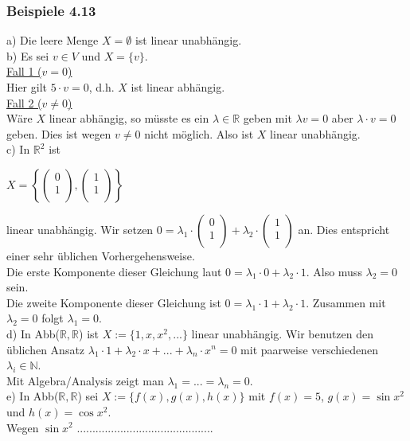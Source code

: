 \documentclass{article}
\begin{document}
\subsubsection*{Beispiele 4.13}
a) Die leere Menge $X = \emptyset$ ist linear unabhängig. \\
b) Es sei $v \in V$ und $X = \{v\}$. \\
\underline{Fall 1 ($v = 0$)} \\
Hier gilt $5 \cdot v = 0$, d.h. $X$ ist linear abhängig. \\
\underline{Fall 2 ($v \neq 0$)} \\
Wäre $X$ linear abhängig, so müsste es ein $\lambda \in \mathbb{R}$ geben mit $\lambda v = 0$ aber $\lambda \cdot v = 0$ geben. Dies ist wegen $v \neq 0$ nicht möglich. Also ist $X$ linear unabhängig. \\
c) In $\mathbb{R}^2$  ist \\
\begin{center}
    $X = \left\{ \begin{pmatrix}
        0 \\
        1 \\
    \end{pmatrix}, \begin{pmatrix}
        1 \\
        1 \\
    \end{pmatrix} \right\}$ \\
\end{center}
linear unabhängig. Wir setzen $0 = \lambda_1 \cdot \begin{pmatrix}
    0 \\
    1 \\
\end{pmatrix} + \lambda_2 \cdot \begin{pmatrix}
    1 \\
    1 \\
    \end{pmatrix}$
an. Dies entspricht einer sehr üblichen Vorhergehensweise. \\
Die erste Komponente dieser Gleichung laut $0 = \lambda_1 \cdot 0 + \lambda_2 \cdot 1$. Also muss $\lambda_2 = 0$ sein. \\
Die zweite Komponente dieser Gleichung ist $0 = \lambda_1 \cdot 1 + \lambda_2 \cdot 1$. Zusammen mit $\lambda_2 = 0$ folgt $\lambda_1 = 0$. \\
d) In Abb($\mathbb{R}, \mathbb{R}$) ist $X:= \{1, x, x^2, ...\}$ linear unabhängig. Wir benutzen den üblichen Ansatz $\lambda_1 \cdot 1 + \lambda_2 \cdot x + ... + \lambda_n \cdot x^n = 0$ mit paarweise verschiedenen $\lambda_i \in \mathbb{N}$. \\
Mit Algebra/Analysis zeigt man $\lambda_1 = ... = \lambda_n = 0$. \\
e) In Abb($\mathbb{R}, \mathbb{R}$) sei $X := \{f(x), g(x), h(x)\}$ mit $f(x)=5$, $g(x)=\sin x^2$ und $h(x)=\cos x^2$. \\
Wegen $\sin x^2$ ............................................ \\
\\
\end{document}
